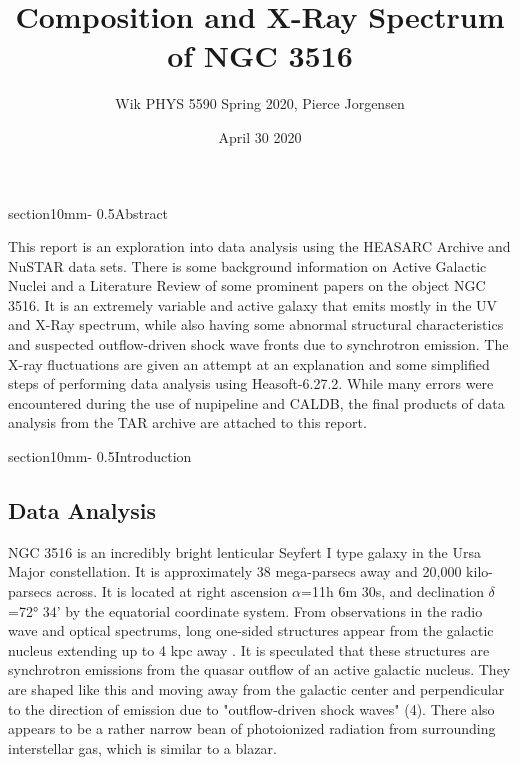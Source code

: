 \documentclass[letterpaper,11pt,twocolumn]{article}
\title{\LARGE \bf
Composition and X-Ray Spectrum of NGC 3516
}
\author{Wik PHYS 5590 Spring 2020, Pierce Jorgensen
}
\date{April 30 2020}
\makeatletter
\renewcommand{\section}{\@startsection%
{section}{1}{0mm}{-\baselineskip}%
{0.5\baselineskip}{\normalfont\Large\bfseries}}%
\makeatother
\begin{document}
\pagestyle{plain}


\maketitle
\thispagestyle{empty}
\pagestyle{empty}




\section{Abstract}

This report is an exploration into data analysis using the HEASARC Archive and NuSTAR data sets. There is some background information on Active Galactic Nuclei and a Literature Review of some prominent papers on the object NGC 3516. It is an extremely variable and active galaxy that emits mostly in the UV and X-Ray spectrum, while also having some abnormal structural characteristics and suspected outflow-driven shock wave fronts due to synchrotron emission. The X-ray fluctuations are given an attempt at an explanation and some simplified steps of performing data analysis using Heasoft-6.27.2. While many errors were encountered during the use of nupipeline and CALDB, the final products of data analysis from the TAR archive are attached to this report.







\section{Introduction}

\subsection{Data Analysis}

NGC 3516 is an incredibly bright lenticular Seyfert I type galaxy in the Ursa Major constellation. It is approximately 38 mega-parsecs away and 20,000 kilo-parsecs across. It is located at right ascension $\alpha$=11h 6m 30s, and declination $\delta$=72\si{\degree} 34' by the equatorial coordinate system. From observations in the radio wave and optical spectrums, long one-sided structures appear from the galactic nucleus extending up to 4 kpc away {\it \citet{MWP+17}}. It is speculated that these structures are synchrotron emissions from the quasar outflow of an active galactic nucleus. They are shaped like this and moving away from the galactic center and perpendicular to the direction of emission due to "outflow-driven shock waves" (4). There also appears to be a rather narrow bean of photoionized radiation from surrounding interstellar gas, which is similar to a blazar.
\end{document}
